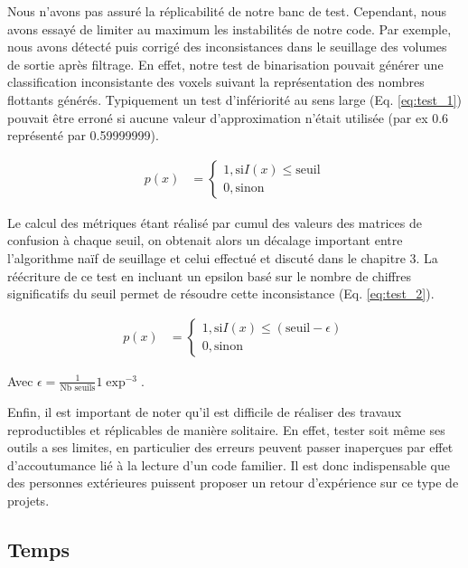 Nous n'avons pas assuré la réplicabilité de notre banc de test. Cependant, nous avons essayé de limiter au maximum les instabilités de notre code. Par exemple, nous avons détecté puis corrigé des inconsistances dans le seuillage des volumes de sortie après filtrage. En effet, notre test de binarisation pouvait générer une classification inconsistante des voxels suivant la représentation des nombres flottants générés. Typiquement un test d’infériorité au sens large (Eq. \ref{eq:test_1}) pouvait être erroné si aucune valeur d’approximation n'était utilisée (par ex 0.6 représenté par 0.59999999).

\begin{align}
    p(x) &=
    \begin{cases}
        1, \text{si} I(x) \leq \text{seuil} \\
        0, \text{sinon}
    \end{cases}
    \label{eq:test_1}
\end{align}
 
Le calcul des métriques étant réalisé par cumul des valeurs des matrices de confusion à chaque seuil, on obtenait alors un décalage important entre l'algorithme naïf de seuillage et celui effectué et discuté dans le chapitre 3. La réécriture de ce test en incluant un epsilon basé sur le nombre de chiffres significatifs du seuil permet de résoudre cette inconsistance (Eq. \ref{eq:test_2}).
 
 \begin{align}
    p(x) &=
    \begin{cases}
        1, \text{si} I(x) \leq (\text{seuil} - \epsilon) \\
        0, \text{sinon}
    \end{cases}
    \label{eq:test_2}
\end{align}
 
 Avec $\epsilon = \frac{1}{ \text{Nb seuils} } 1\exp^{-3}$.

Enfin, il est important de noter qu'il est difficile de réaliser des travaux reproductibles et réplicables de manière solitaire. En effet, tester soit même ses outils a ses limites, en particulier des erreurs peuvent passer inaperçues par effet d'accoutumance lié à la lecture d'un code familier. Il est donc indispensable que des personnes extérieures puissent proposer un retour d'expérience sur ce type de projets.

\subsection{Temps}

